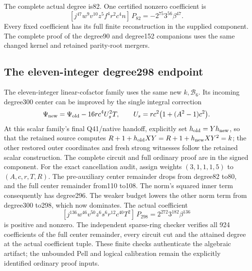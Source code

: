 The complete actual degree is82. One certified nonzero coefficient is
\[
 [j^{47}w^9v^{10}z^5f^4r^2c^4n]\,P_{82}
       =-2^{75}3^{56}\beta^{47}.
\]
Every fixed coefficient has its full finite reconstruction in the supplied
component. The complete proof of the degree90 and degree152 companions
uses the same changed kernel and retained parity-root mergers.

\subsection{The eleven-integer degree298 endpoint}
The eleven-integer linear-cofactor family uses the same new
$k,\mathcal B_6$. Its incoming degree300 center can be improved by the
single integral correction
\[
 \Psi_{\rm new}=\Psi_{\rm old}-16rc^4U_s^2T,
 \qquad U_s=rc^2\bigl(1+(A^2-1)c^2\bigr).
\]
At this scalar family's final Q41/native handoff, explicitly set
$h_{\rm old}=Yh_{\rm new}$, so that the retained source computes
$R+1+h_{\rm old}XY=R+1+h_{\rm new}XY^2=k$; the other restored outer
coordinates and fresh strong witnesses follow the retained scalar
construction.
The complete circuit and full ordinary proof are in the signed component.
For the exact cancellation audit, assign weights $(3,1,1,1,5)$ to
$(A,c,r,T,R)$. The pre-auxiliary center remainder drops from degree82 to80,
and the full center remainder from110 to108. The norm's squared inner
term consequently has degree296. The weaker budget lowers the other
norm term from degree300 to298, which now dominates. The actual
coefficient
\[
 [j^{136}w^{46}v^{50}z^6s^6r^{12}c^{40}T^2]\,P_{298}
       =2^{272}3^{182}\beta^{136}
\]
is positive and nonzero. The independent sparse-ring checker verifies all
924 coefficients of the full center remainder, every circuit cut and the
attained degree at the actual coefficient tuple. These finite checks
authenticate the algebraic artifact; the unbounded Pell and logical
calibration remain the explicitly identified ordinary proof inputs.
